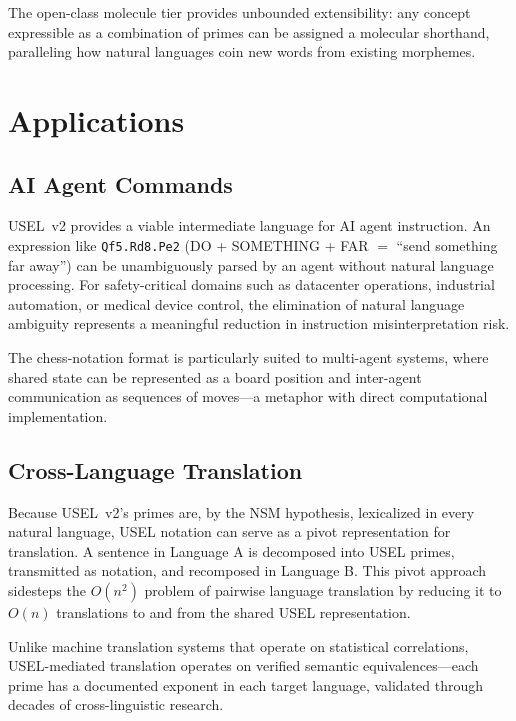 \documentclass[11pt,a4paper]{article}
\begin{document}
The open-class molecule tier provides unbounded extensibility: any concept expressible as a combination of primes can be assigned a molecular shorthand, paralleling how natural languages coin new words from existing morphemes.

\section{Applications}
\label{sec:applications}

\subsection{AI Agent Commands}
\label{sec:ai-agents}

USEL~v2 provides a viable intermediate language for AI agent instruction. An expression like \texttt{Qf5.Rd8.Pe2} (DO + SOMETHING + FAR $=$ ``send something far away'') can be unambiguously parsed by an agent without natural language processing. For safety-critical domains such as datacenter operations, industrial automation, or medical device control, the elimination of natural language ambiguity represents a meaningful reduction in instruction misinterpretation risk.

The chess-notation format is particularly suited to multi-agent systems, where shared state can be represented as a board position and inter-agent communication as sequences of moves---a metaphor with direct computational implementation.

\subsection{Cross-Language Translation}
\label{sec:translation}

Because USEL~v2's primes are, by the NSM hypothesis, lexicalized in every natural language, USEL notation can serve as a pivot representation for translation. A sentence in Language A is decomposed into USEL primes, transmitted as notation, and recomposed in Language B. This pivot approach sidesteps the $O(n^2)$ problem of pairwise language translation by reducing it to $O(n)$ translations to and from the shared USEL representation.

Unlike machine translation systems that operate on statistical correlations, USEL-mediated translation operates on verified semantic equivalences---each prime has a documented exponent in each target language, validated through decades of cross-linguistic research.
\end{document}
